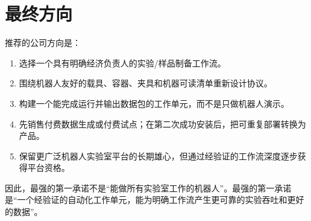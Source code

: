 \documentclass[11pt,fontset=none]{ctexart}
\begin{document}
\clearpage
\section{最终方向}

推荐的公司方向是：

\begin{enumerate}
  \item 选择一个具有明确经济负责人的实验/样品制备工作流。
  \item 围绕机器人友好的载具、容器、夹具和机器可读清单重新设计协议。
  \item 构建一个能完成运行并输出数据包的工作单元，而不是只做机器人演示。
  \item 先销售付费数据生成或付费试点；在第二次成功安装后，把可重复部署转换为产品。
  \item 保留更广泛机器人实验室平台的长期雄心，但通过经验证的工作流深度逐步获得平台资格。
\end{enumerate}

因此，最强的第一承诺不是“能做所有实验室工作的机器人”。最强的第一承诺是“一个经验证的自动化工作单元，能为明确工作流产生更可靠的实验吞吐和更好的数据”。
\end{document}

